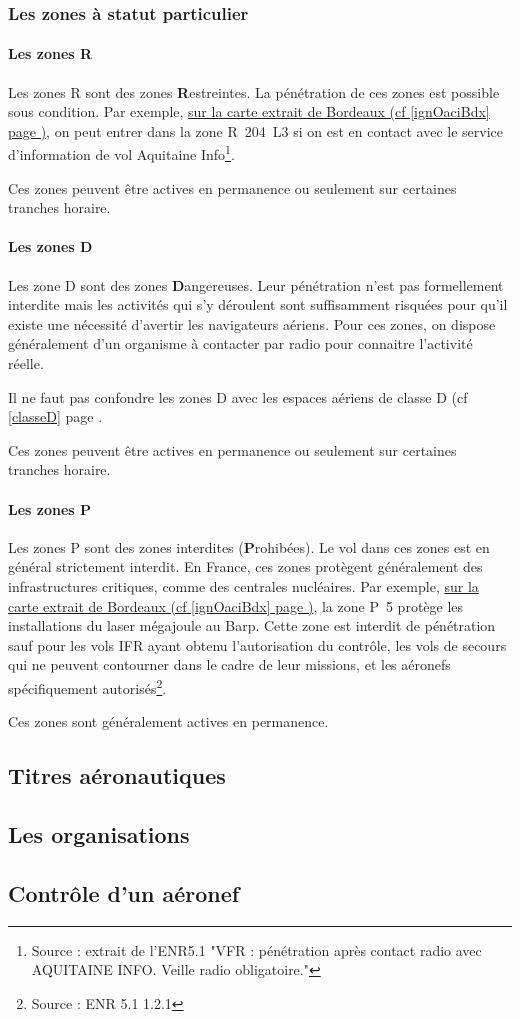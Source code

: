 		\subsubsection{Les zones à statut particulier}
			\paragraph{Les zones R}
			Les zones R sont des zones \textbf{R}estreintes. La pénétration de ces zones est possible sous condition. Par exemple, \hyperlink{ignOaciBordeaux.1}{sur la carte extrait de Bordeaux (cf \ref{ignOaciBdx} page \pageref{ignOaciBdx})}, on peut entrer dans la zone R~204~L3 si on est en contact avec le service d'information de vol Aquitaine Info\footnote{Source : extrait de l'ENR5.1 "VFR : pénétration après contact radio avec AQUITAINE INFO. Veille radio obligatoire."}.
			
			Ces zones peuvent être actives en permanence ou seulement sur certaines tranches horaire.
			
			\paragraph{Les zones D}
			Les zone D sont des zones \textbf{D}angereuses. Leur pénétration n'est pas formellement interdite mais les activités qui s'y déroulent sont suffisamment risquées pour qu'il existe une nécessité d'avertir les navigateurs aériens. Pour ces zones, on dispose généralement d'un organisme à contacter par radio pour connaitre l'activité réelle.
			
			\alert{Il ne faut pas confondre les zones D avec les espaces aériens de classe D (cf \ref{classeD} page \pageref{classeD}}.
			
			Ces zones peuvent être actives en permanence ou seulement sur certaines tranches horaire.
			
			\paragraph{Les zones P}
			Les zones P sont des zones interdites (\textbf{P}rohibées). Le vol dans ces zones est en général strictement interdit. En France, ces zones protègent généralement des infrastructures critiques, comme des centrales nucléaires. Par exemple, \hyperlink{ignOaciBordeaux.1}{sur la carte extrait de Bordeaux (cf \ref{ignOaciBdx} page \pageref{ignOaciBdx})}, la zone P~5 protège les installations du laser mégajoule au Barp. Cette zone est interdit de pénétration sauf pour les vols IFR ayant obtenu l'autorisation du contrôle, les vols de secours qui ne peuvent contourner dans le cadre de leur missions, et les aéronefs spécifiquement autorisés\footnote{Source : ENR 5.1 1.2.1}.
			
			Ces zones sont généralement actives en permanence.
	
	\subsection{Titres aéronautiques}
	
	\subsection{Les organisations}
	
	\subsection{Contrôle d'un aéronef}